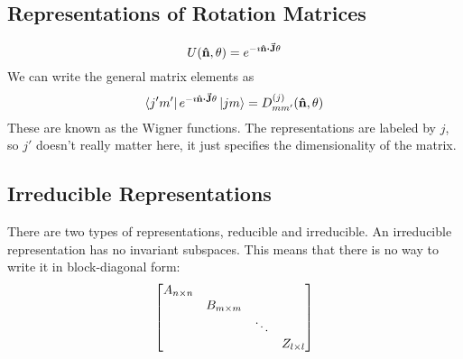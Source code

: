 \documentclass[a4paper,twoside,master.tex]{subfiles}
\begin{document}
\subsection{Representations of Rotation Matrices}
\label{sub:representations_of_rotation_matrices}

\begin{equation}
    U(\vu{n}, \theta) = e^{- \imath \vu{n} \vdot \va{J} \theta}
\end{equation}
We can write the general matrix elements as
\begin{equation}
    \bra{j'm'} e^{- \imath \vu{n} \vdot \va{J} \theta}\ket{jm} = D^{(j)}_{mm'}(\vu{n}, \theta)
\end{equation}
These are known as the Wigner functions. The representations are labeled by $ j $, so $ j' $ doesn't really matter here, it just specifies the dimensionality of the matrix.

\subsection{Irreducible Representations}
\label{sub:irreducible_representations}

There are two types of representations, reducible and irreducible. An irreducible representation has no invariant subspaces. This means that there is no way to write it in block-diagonal form:
\begin{equation}
    \mqty[\dmat{A_{n \times n}, B_{m \times m}, \ddots, Z_{l \times l}}]
\end{equation}
\end{document}
